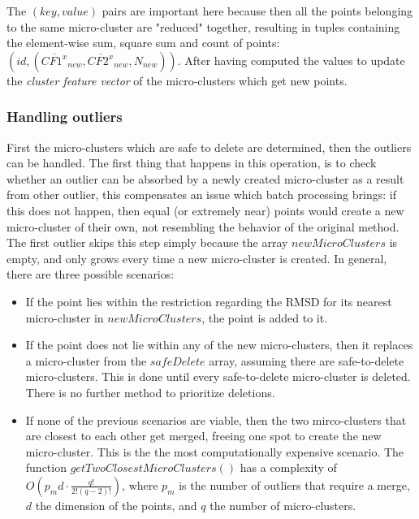 The $(key,value)$ pairs are important here because then all the points belonging to the same micro-cluster are "reduced" together, resulting in tuples containing the element-wise sum, square sum and count of points: $(id,(\overline{CF1^x}_{new}, \overline{CF2^x}_{new}, N_{new}))$. After having computed the values to update the \textit{cluster feature vector} of the micro-clusters which get new points.


\subsubsection{Handling outliers}\label{handlingoutliers}


First the micro-clusters which are safe to delete are determined, then the outliers can be handled. The first thing that happens in this operation, is to check whether an outlier can be absorbed by a newly created micro-cluster as a result from other outlier, this compensates an issue which batch processing brings: if this does not happen, then equal (or extremely near) points would create a new micro-cluster of their own, not resembling the behavior of the original method. The first outlier skips this step simply because the array $newMicroClusters$ is empty, and only grows every time a new micro-cluster is created. In general, there are three possible scenarios:

\begin{itemize}
 \item If the point lies within the restriction regarding the RMSD for its nearest micro-cluster in $newMicroClusters$, the point is added to it.
 \item If the point does not lie within any of the new micro-clusters, then it replaces a micro-cluster from the $safeDelete$ array, assuming there are safe-to-delete micro-clusters. This is done until every safe-to-delete micro-cluster is deleted. There is no further method to prioritize deletions.
 \item If none of the previous scenarios are viable, then the two mirco-clusters that are closest to each other get merged, freeing one spot to create the new micro-cluster. This is the the most computationally expensive scenario. The function $getTwoClosestMicroClusters()$ has a complexity of $O(p_{m}d\cdot \frac{q!}{2!(q-2)!})$, where $p_m$ is the number of outliers that require a merge, $d$ the dimension of the points, and $q$ the number of micro-clusters.
\end{itemize}


